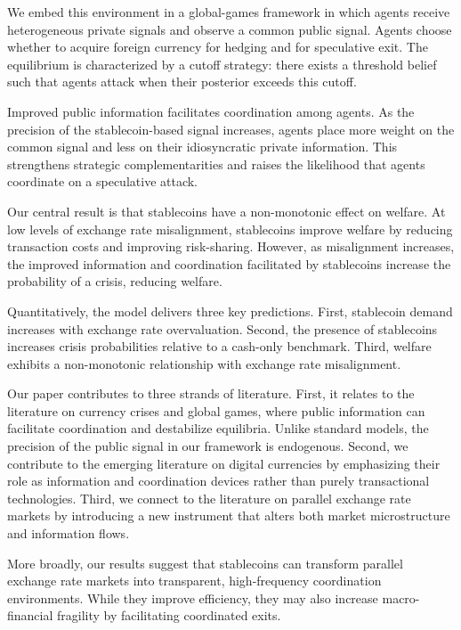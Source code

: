 We embed this environment in a global-games framework in which agents receive heterogeneous private signals and observe a common public signal. Agents choose whether to acquire foreign currency for hedging and for speculative exit. The equilibrium is characterized by a cutoff strategy: there exists a threshold belief such that agents attack when their posterior exceeds this cutoff.

Improved public information facilitates coordination among agents. As the precision of the stablecoin-based signal increases, agents place more weight on the common signal and less on their idiosyncratic private information. This strengthens strategic complementarities and raises the likelihood that agents coordinate on a speculative attack.

Our central result is that stablecoins have a non-monotonic effect on welfare. At low levels of exchange rate misalignment, stablecoins improve welfare by reducing transaction costs and improving risk-sharing. However, as misalignment increases, the improved information and coordination facilitated by stablecoins increase the probability of a crisis, reducing welfare.

Quantitatively, the model delivers three key predictions. First, stablecoin demand increases with exchange rate overvaluation. Second, the presence of stablecoins increases crisis probabilities relative to a cash-only benchmark. Third, welfare exhibits a non-monotonic relationship with exchange rate misalignment.

Our paper contributes to three strands of literature. First, it relates to the literature on currency crises and global games, where public information can facilitate coordination and destabilize equilibria. Unlike standard models, the precision of the public signal in our framework is endogenous. Second, we contribute to the emerging literature on digital currencies by emphasizing their role as information and coordination devices rather than purely transactional technologies. Third, we connect to the literature on parallel exchange rate markets by introducing a new instrument that alters both market microstructure and information flows.

More broadly, our results suggest that stablecoins can transform parallel exchange rate markets into transparent, high-frequency coordination environments. While they improve efficiency, they may also increase macro-financial fragility by facilitating coordinated exits.
